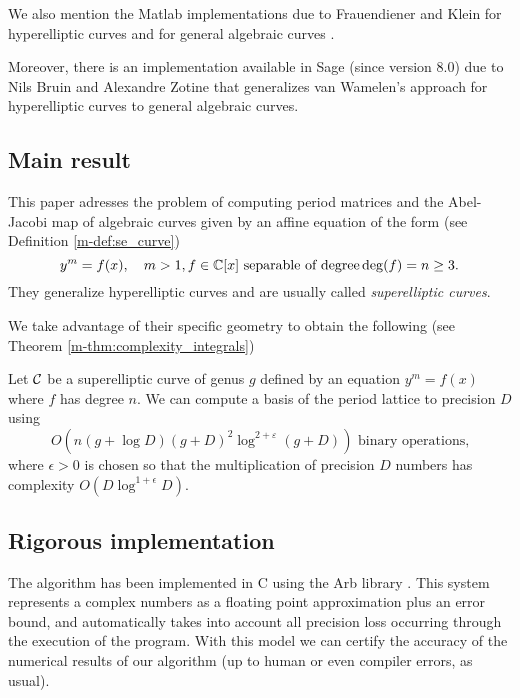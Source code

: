 \documentclass[main.tex]{subfiles}
\begin{document}
  We also mention the Matlab implementations due to Frauendiener and Klein for hyperelliptic curves \cite{FrauendienerKlein2015}
    and for general algebraic curves \cite{FrauendienerKlein2011}.
  
  Moreover, there is an implementation available in Sage (since version 8.0) due to Nils Bruin and Alexandre Zotine that generalizes
  van Wamelen's approach for hyperelliptic curves to general algebraic curves.
  
  \subsection{Main result}

  This paper adresses the problem of computing period matrices and the
  Abel-Jacobi map of algebraic curves given by an affine equation of the form  (see Definition \ref{m-def:se_curve})
  \begin{equation*}
  y^m = f(x), \quad m > 1, f \in \mathbb{C}[x] \text{ separable of degree} \operatorname{deg}(f) = n \ge 3.
  \end{equation*}
  They generalize
  hyperelliptic curves and are usually called \textit{superelliptic curves}.

  We take advantage of their specific geometry to obtain the following
  (see Theorem \ref{m-thm:complexity_integrals})
  \begin{thm}
      Let $\mathcal{C}$ be a superelliptic curve of genus $g$ defined by an equation $y^m=f(x)$
      where $f$ has degree $n$.
      We can compute a basis of the period lattice to
      precision $D$ using $$O(n(g+\log D)(g+D)^2\log^{2+\varepsilon} (g+D)) \text{ binary operations,}$$
      where $\epsilon>0$ is chosen so that
      the multiplication of precision $D$ numbers has complexity
      $O(D\log^{1+\epsilon}D)$.
  \end{thm}

  \subsection{Rigorous implementation}
  \label{subsec:arb}

  The algorithm has been implemented in C using the Arb library \cite{Johansson2013arb}.
  This system represents a complex numbers as a floating point approximation
  plus an error bound, and automatically
  takes into account all precision loss occurring through the
  execution of the program. With this model we can certify
  the accuracy of the numerical results of our algorithm (up to human or even
  compiler errors, as usual).
\end{document}
